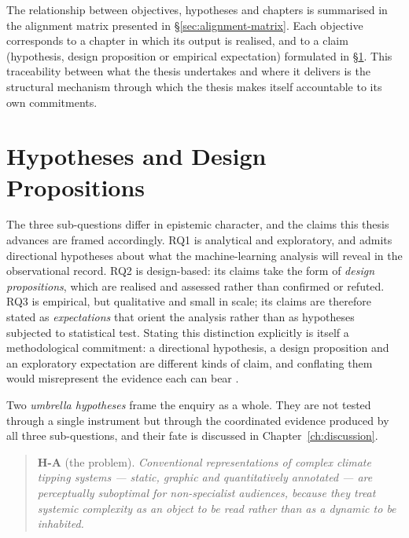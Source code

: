 The relationship between objectives, hypotheses and chapters is summarised in the alignment matrix presented in §\ref{sec:alignment-matrix}. Each objective corresponds to a chapter in which its output is realised, and to a claim (hypothesis, design proposition or empirical expectation) formulated in §\ref{sec:hypotheses}. This traceability between what the thesis undertakes and where it delivers is the structural mechanism through which the thesis makes itself accountable to its own commitments.

\section{Hypotheses and Design Propositions}
\label{sec:hypotheses}

The three sub-questions differ in epistemic character, and the claims this thesis advances are framed accordingly. RQ1 is analytical and exploratory, and admits directional hypotheses about what the machine-learning analysis will reveal in the observational record. RQ2 is design-based: its claims take the form of \emph{design propositions}, which are realised and assessed rather than confirmed or refuted. RQ3 is empirical, but qualitative and small in scale; its claims are therefore stated as \emph{expectations} that orient the analysis rather than as hypotheses subjected to statistical test. Stating this distinction explicitly is itself a methodological commitment: a directional hypothesis, a design proposition and an exploratory expectation are different kinds of claim, and conflating them would misrepresent the evidence each can bear \citep{cronbach1975, mckenney2018}.

Two \emph{umbrella hypotheses} frame the enquiry as a whole. They are not tested through a single instrument but through the coordinated evidence produced by all three sub-questions, and their fate is discussed in Chapter~\ref{ch:discussion}.

\begin{quote}
\textbf{H-A} (the problem). \emph{Conventional representations of complex climate tipping systems --- static, graphic and quantitatively annotated --- are perceptually suboptimal for non-specialist audiences, because they treat systemic complexity as an object to be read rather than as a dynamic to be inhabited.}
\end{quote}

